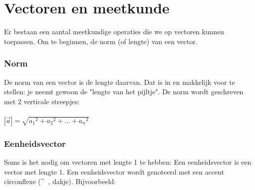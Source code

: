 

\section{Vectoren en meetkunde}
Er bestaan een aantal meetkundige operaties die we op vectoren kunnen toepassen.
Om  te beginnen, de norm (of lengte) van een vector.

\subsubsection{Norm}
De norm van een vector is de lengte daarvan. Dat is in \RD en \RT makkelijk  voor te stellen: je neemt gewoon de "lengte van het pijltje". De norm wordt geschreven met 2 verticale streepjes:\\ \\

{$|\vec{a}| = \sqrt{ {a_1}^{2} + {a_2}^{2} + . . . +{a_n}^{2}}$\\ }


\subsubsection{Eenheidsvector}
Soms is het nodig om vectoren met lengte 1 te hebben:
{Een eenheidsvector is een vector met lengte 1.}
Een eenheidsvector wordt genoteerd met een accent circonflexe (\textasciicircum \ , dakje). Bijvoorbeeld:\\ 

